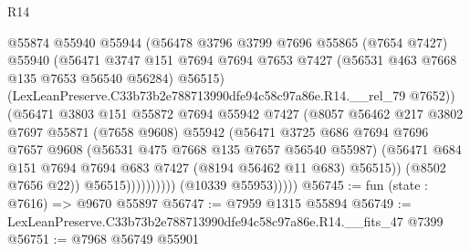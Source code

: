 \begin{lexlean}{R14}
\begin{coremodule}
                              @55874
                              @55940
                              @55944
                              (@56478
                                @3796
                                @3799
                                @7696
                                @55865
                                (@7654 @7427)
                                @55940
                                (@56471
                                  @3747
                                  @151
                                  @7694
                                  @7694
                                  @7653
                                  @7427
                                  (@56531 @463 @7668 @135 @7653 @56540 @56284)
                                  @56515)
                                (LexLeanPreserve.C33b73b2e788713990dfe94c58c97a86e.R14.__rel_79
                                  @7652))
                              (@56471
                                @3803
                                @151
                                @55872
                                @7694
                                @55942
                                @7427
                                (@8057
                                  @56462
                                  @217
                                  @3802
                                  @7697
                                  @55871
                                  (@7658 @9608)
                                  @55942
                                  (@56471
                                    @3725
                                    @686
                                    @7694
                                    @7696
                                    @7657
                                    @9608
                                    (@56531 @475 @7668 @135 @7657 @56540 @55987)
                                    (@56471
                                      @684
                                      @151
                                      @7694
                                      @7694
                                      @683
                                      @7427
                                      (@8194 @56462 @11 @683)
                                      @56515))
                                  (@8502 @7656 @22))
                                @56515))))))))))
            (@10339 @55953)))))
@56745 := fun (state : @7616) => @9670 @55897
@56747 := @7959 @1315 @55894
@56749 := LexLeanPreserve.C33b73b2e788713990dfe94c58c97a86e.R14.__fits_47 @7399
@56751 := @7968 @56749 @55901

\end{coremodule}
\end{lexlean}
